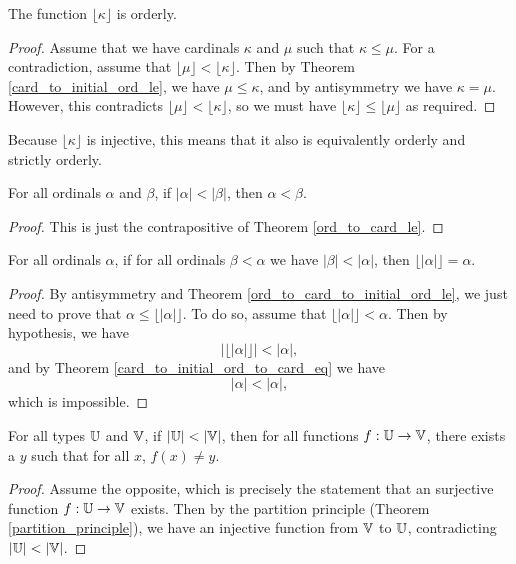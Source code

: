 \documentclass[../../math.tex]{subfiles}
\begin{document}
\begin{instance}
    The function $\lfloor \kappa \rfloor$ is orderly.
\end{instance}
\begin{proof}
    Assume that we have cardinals $\kappa$ and $\mu$ such that $\kappa \leq
    \mu$.  For a contradiction, assume that $\lfloor \mu \rfloor < \lfloor
    \kappa \rfloor$.  Then by Theorem \ref{card_to_initial_ord_le}, we have $\mu
    \leq \kappa$, and by antisymmetry we have $\kappa = \mu$.  However, this
    contradicts $\lfloor \mu \rfloor < \lfloor \kappa \rfloor$, so we must have
    $\lfloor \kappa \rfloor \leq \lfloor \mu \rfloor$ as required.
\end{proof}

Because $\lfloor \kappa \rfloor$ is injective, this means that it also is
equivalently orderly and strictly orderly.

\begin{theorem} \label{ord_to_card_lt}
    For all ordinals $\alpha$ and $\beta$, if $|\alpha| < |\beta|$, then $\alpha
    < \beta$.
\end{theorem}
\begin{proof}
    This is just the contrapositive of Theorem \ref{ord_to_card_le}.
\end{proof}

\begin{theorem} \label{card_to_initial_ord_other_eq}
    For all ordinals $\alpha$, if for all ordinals $\beta < \alpha$ we have
    $|\beta| < |\alpha|$, then $\lfloor | \alpha | \rfloor = \alpha$.
\end{theorem}
\begin{proof}
    By antisymmetry and Theorem \ref{ord_to_card_to_initial_ord_le}, we just
    need to prove that $\alpha \leq \lfloor | \alpha | \rfloor$.  To do so,
    assume that $\lfloor | \alpha | \rfloor < \alpha$.  Then by hypothesis, we
    have
    \[
        |\lfloor|\alpha|\rfloor| < |\alpha|,
    \]
    and by Theorem \ref{card_to_initial_ord_to_card_eq} we have
    \[
        |\alpha| < |\alpha|,
    \]
    which is impossible.
\end{proof}

\begin{theorem} \label{card_lt_ex}
    For all types $\mathbb{U}$ and $\mathbb{V}$, if $|\mathbb{U}| < |\mathbb{V}|$, then for all functions $f :
    \mathbb{U} \to \mathbb{V}$, there exists a $y$ such that for all $x$, $f(x) \neq y$.
\end{theorem}
\begin{proof}
    Assume the opposite, which is precisely the statement that an surjective
    function $f : \mathbb{U} \to \mathbb{V}$ exists.  Then by the partition principle (Theorem
    \ref{partition_principle}), we have an injective function from $\mathbb{V}$ to $\mathbb{U}$,
    contradicting $|\mathbb{U}| < |\mathbb{V}|$.
\end{proof}
\end{document}
